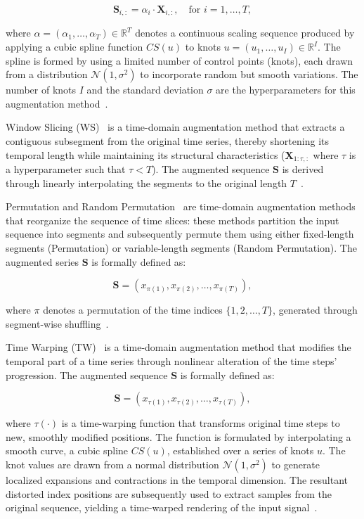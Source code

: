 \[ \mathbf{S}_{i,:} = \alpha_i \cdot \mathbf{X}_{i,:}, \quad \text{for } i = 1, \dots, T, \]

where $\alpha = (\alpha_1, \dots, \alpha_T) \in \mathbb{R}^T$ denotes a continuous scaling sequence produced by applying a cubic spline function $CS(u)$ to knots $u=(u_1, \dots, u_I) \in \mathbb{R}^I$. The spline is formed by using a limited number of control points (knots), each drawn from a distribution $\mathcal{N}(1, \sigma^2)$ to incorporate random but smooth variations. The number of knots $I$ and the standard deviation $\sigma$ are the hyperparameters for this augmentation method~\cite{10.1371/journal.pone.0315343}.


Window Slicing (WS)~\cite{leguennec:halshs-01357973} is a time-domain augmentation method that extracts a contiguous subsegment from the original time series, thereby shortening its temporal length while maintaining its structural characteristics ($\mathbf{X}_{1:\tau, :}$ where $\tau$ is a hyperparameter such that $\tau < T$). The augmented sequence $\mathbf{S}$ is derived through linearly interpolating the segments to the original length $T$~\cite{10.1371/journal.pone.0315343}. 


Permutation and Random Permutation~\cite{Um_2017, Pan2020} are time-domain augmentation methods that reorganize the sequence of time slices: these methods partition the input sequence into segments and subsequently permute them using either fixed-length segments (Permutation) or variable-length segments (Random Permutation). The augmented series $\mathbf{S}$ is formally defined as:

\[ \mathbf{S} = (x_{\pi(1)}, x_{\pi(2)}, \ldots, x_{\pi(T)}), \]

where $\pi$ denotes a permutation of the time indices $\{1, 2, \dots, T\}$, generated through segment-wise shuffling~\cite{10.1371/journal.pone.0254841, 10.1371/journal.pone.0315343}.


Time Warping (TW)~\cite{Um_2017, Park_2019} is a time-domain  augmentation method that modifies the temporal part of a time series through nonlinear alteration of the time steps' progression. The augmented sequence $\mathbf{S}$ is formally defined as:


\[ \mathbf{S} = (x_{\tau(1)}, x_{\tau(2)}, \ldots, x_{\tau(T)}), \]

where $\tau(\cdot)$ is a time-warping function that transforms original time steps to new, smoothly modified positions. The function is formulated by interpolating a smooth curve, a cubic spline $CS(u)$, established over a series of knots $u$. The knot values are drawn from a normal distribution $\mathcal{N}(1, \sigma^2)$ to generate localized expansions and contractions in the temporal dimension. The resultant distorted index positions are subsequently used to extract samples from the original sequence, yielding a time-warped rendering of the input signal~\cite{10.1371/journal.pone.0254841}.


